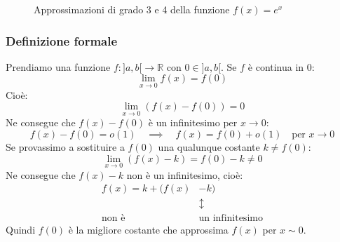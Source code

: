 \begin{figure}
\centering
\begin{subfigure}{0.49\textwidth}
\centering
\end{subfigure}
\begin{subfigure}{0.49\textwidth}
\centering
\end{subfigure}
	\caption{Approssimazioni di grado 3 e 4 della funzione $f(x) = e^x$} 
\label{fig_approxEsponenziale2}
\end{figure}



\subsubsection{Definizione formale}
Prendiamo una funzione $f:]a,b[ \to \mathbb{R}$ con $0 \in ]a,b[$. Se $f$ è continua in 0:
\begin{equation*}
	\lim_{x \to 0} f(x) = f(0)
\end{equation*}
Cioè:
\begin{equation*}
	\lim_{x \to 0} (f(x) - f(0)) = 0
\end{equation*}
Ne consegue che $f(x) - f(0)$ è un infinitesimo per $x \to 0$:
\begin{equation*}
	f(x) - f(0) = o(1) \quad \implies \quad f(x) = f(0) + o(1) \quad \text{per } x \to 0
\end{equation*}
Se provassimo a sostituire a $f(0)$ una qualunque costante $k \neq f(0)$:
\begin{equation*}
	\lim_{x \to 0} (f(x) - k) = f(0) - k \neq 0
\end{equation*}
Ne consegue che $f(x) - k$ non è un infinitesimo, cioè:
\begin{align*}
	f(x) = k + (f(x) &- k)\\
	&\updownarrow\\
	\text{non è } & \text{un infinitesimo}
\end{align*}
Quindi $f(0)$ è la migliore costante che approssima $f(x)$ per $x \sim 0$.\\

